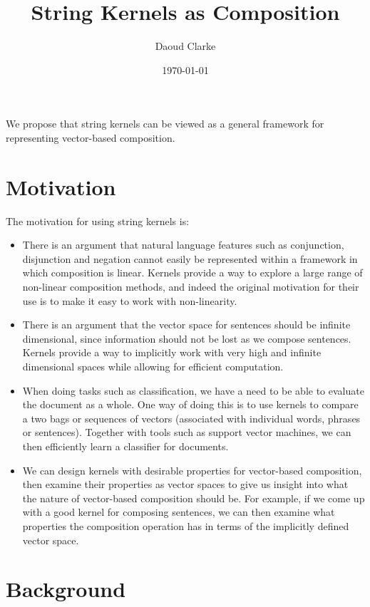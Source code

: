 \documentclass{article}
\author{Daoud Clarke}
\date{\today}
\title{String Kernels as Composition}
\begin{document}
\maketitle

We propose that string kernels can be viewed as a general framework
for representing vector-based composition.

\section{Motivation}

The motivation for using string kernels is:
\begin{itemize}
\item There is an argument that natural language features such as
  conjunction, disjunction and negation cannot easily be represented
  within a framework in which composition is linear. Kernels provide a
  way to explore a large range of non-linear composition methods, and
  indeed the original motivation for their use is to make it easy to
  work with non-linearity.
\item There is an argument that the vector space for sentences should
  be infinite dimensional, since information should not be lost as we
  compose sentences. Kernels provide a way to implicitly work with
  very high and infinite dimensional spaces while allowing for
  efficient computation.
\item When doing tasks such as classification, we have a need to be
  able to evaluate the document as a whole. One way of doing this is to
  use kernels to compare a two bags or sequences of vectors
  (associated with individual words, phrases or sentences). Together
  with tools such as support vector machines, we can then efficiently
  learn a classifier for documents.
\item We can design kernels with desirable properties for vector-based
  composition, then examine their properties as vector spaces to give
  us insight into what the nature of vector-based composition should
  be. For example, if we come up with a good kernel for composing
  sentences, we can then examine what properties the composition
  operation has in terms of the implicitly defined vector space.
\end{itemize}

\section{Background}
\end{document}
